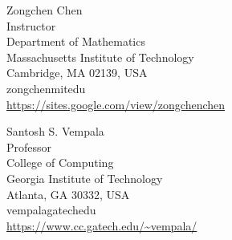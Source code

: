 \documentclass{toc}
\begin{document}

%
%
%
%





%
%
%
%
%
\begin{tocauthors}
\begin{tocinfo}[chen] %
 Zongchen Chen\\
 Instructor\\
 Department of Mathematics\\
 Massachusetts Institute of Technology\\
 Cambridge, MA 02139, USA\\
 zongchen\tocat{}mit\tocdot{}edu\\   %
 \url{https://sites.google.com/view/zongchenchen}      %
\end{tocinfo}
\begin{tocinfo}[vempala]
  Santosh S. Vempala\\
  Professor\\
  College of Computing\\
  Georgia Institute of Technology\\
  Atlanta, GA 30332, USA\\
  vempala\tocat{}gatech\tocdot{}edu\\
  \url{https://www.cc.gatech.edu/~vempala/}
\end{tocinfo}
\end{tocauthors}
\end{document}
